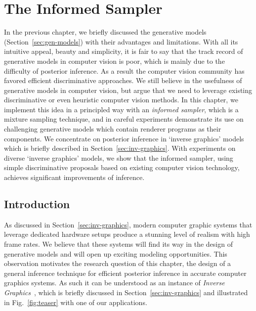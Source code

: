 \chapter{The Informed Sampler}
\label{chap:infsampler}

\newcommand{\INDLMH}{INF-INDMH\xspace}
\newcommand{\MIXLMH}{INF-MH\xspace}
\newcommand{\INFBMHWG}{INF-BMHWG\xspace}
\newcommand{\REGMH}{REG-MH\xspace}
\newcommand{\REGAMH}{REG-MH\xspace}
\newcommand{\MIXLMHRF}{INF-RFMH\xspace}
\newcommand{\MH}{MH\xspace}
\newcommand{\MHWG}{MHWG\xspace}
\newcommand{\PT}{PT\xspace}
\newcommand{\BMHWG}{BMHWG\xspace}
\newcommand{\obsI}{\hat{I}}

\newcommand{\thetaProp}{\bar{\theta}}

In the previous chapter, we briefly discussed the generative models (Section~\ref{sec:gen-models})
with their advantages and limitations. With all its intuitive appeal, beauty
and simplicity, it is fair to say that the track record of generative models
in computer vision is poor, which is mainly due to the difficulty of posterior inference.
As a result the computer vision community has favored efficient discriminative
approaches.
%
We still believe in the usefulness of generative models in computer vision,
but argue that we need to leverage existing discriminative or even heuristic
computer vision methods.
%
In this chapter, we implement this idea in a principled way with an
\emph{informed sampler}, which is a mixture sampling technique,
 and in careful experiments demonstrate its use on
challenging generative models which contain renderer programs as their components.
We concentrate on posterior inference in `inverse graphics' models which is briefly
described in Section~\ref{sec:inv-graphics}.
%
With experiments on diverse `inverse graphics' models,
we show that the informed sampler, using simple discriminative proposals based on existing
computer vision technology, achieves significant improvements of inference.

\section{Introduction}
\label{sec:introduction}

As discussed in Section~\ref{sec:inv-graphics}, modern computer graphic systems
that leverage dedicated hardware setups produce a stunning level of realism with
high frame rates. We believe that these systems will find its way in
the design of generative models and will open up exciting modeling
opportunities.
This observation motivates the research question of this chapter, the
design of a general inference technique for efficient posterior
inference in accurate computer graphics systems. As such it can be
understood as an instance of \emph{Inverse Graphics}~\cite{baumgart1974inversegraphics},
which is briefly discussed in Section~\ref{sec:inv-graphics} and
illustrated in Fig.~\ref{fig:teaser} with one of our applications.

